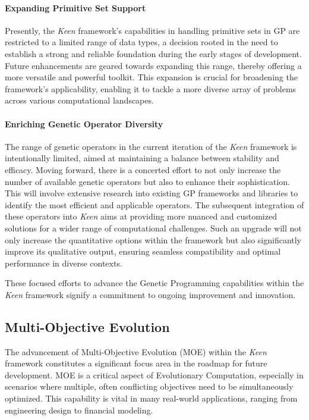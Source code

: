             \paragraph{Expanding Primitive Set Support}
                Presently, the \textit{Keen} framework's capabilities in handling primitive sets in GP are restricted to 
                a limited range of data types, a decision rooted in the need to establish a strong and reliable 
                foundation during the early stages of development. Future enhancements are geared towards expanding this 
                range, thereby offering a more versatile and powerful toolkit. This expansion is crucial for broadening 
                the framework's applicability, enabling it to tackle a more diverse array of problems across various 
                computational landscapes.
        
            \paragraph{Enriching Genetic Operator Diversity}
                The range of genetic operators in the current iteration of the \textit{Keen} framework is intentionally 
                limited, aimed at maintaining a balance between stability and efficacy. Moving forward, there is a 
                concerted effort to not only increase the number of available genetic operators but also to enhance 
                their sophistication. This will involve extensive research into existing GP frameworks and libraries to 
                identify the most efficient and applicable operators. The subsequent integration of these operators into 
                \textit{Keen} aims at providing more nuanced and customized solutions for a wider range of computational 
                challenges. Such an upgrade will not only increase the quantitative options within the framework but 
                also significantly improve its qualitative output, ensuring seamless compatibility and optimal 
                performance in diverse contexts.
        
            These focused efforts to advance the Genetic Programming capabilities within the \textit{Keen} framework 
            signify a commitment to ongoing improvement and innovation.

    \subsection{Multi-Objective Evolution}
    \label{sec:future:moe}
        The advancement of Multi-Objective Evolution (MOE) within the \textit{Keen} framework constitutes a significant 
        focus area in the roadmap for future development. MOE is a critical aspect of Evolutionary Computation, 
        especially in scenarios where multiple, often conflicting objectives need to be simultaneously optimized. This 
        capability is vital in many real-world applications, ranging from engineering design to financial modeling.

